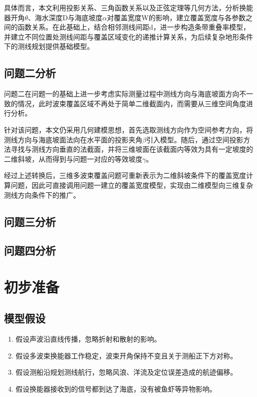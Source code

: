 \documentclass[UTF-8,a4paper,zihao=-4]{ctexart}
\begin{document}
具体而言，本文利用投影关系、三角函数关系以及正弦定理等几何方法，分析换能器开角$\theta$、海水深度D与海底坡度$\alpha$对覆盖宽度W的影响，建立覆盖宽度与各参数之间的函数关系。在此基础上，结合相邻测线间距d，进一步构造条带重叠率模型，并建立不同位置处测线间距与覆盖区域变化的递推计算关系，为后续复杂地形条件下的测线规划提供基础模型。

\subsection{问题二分析}
问题二在问题一的基础上进一步考虑实际测量过程中测线方向与海底坡面方向不一致的情况，此时波束覆盖区域不再处于简单二维截面内，而需要从三维空间角度进行分析。

针对该问题，本文仍采用几何建模思想，首先选取测线方向作为空间参考方向，将测线方向与海底坡面法向在水平面的投影夹角$\beta$引入模型。随后，通过空间投影方法寻找与测线方向垂直的法截面，并将三维坡面在该截面内等效为具有一定坡度的二维斜坡，从而得到与问题一对应的等效坡度$\gamma$。

经过上述转换后，三维多波束覆盖问题可重新表示为二维斜坡条件下的覆盖宽度计算问题，因此可直接调用问题一建立的覆盖宽度模型，实现由二维模型向三维复杂测线方向条件下的推广。

\subsection{问题三分析}

\subsection{问题四分析}
\section{初步准备}
\subsection{模型假设}
\begin{enumerate}
    \item 假设声波沿直线传播，忽略折射和散射的影响。
    \item 假设多波束换能器工作稳定，波束开角保持不变且关于测船正下方对称。
    \item 假设测船沿规划测线航行，忽略风浪、洋流及定位误差造成的航迹偏移。
    \item 假设换能器接收到的信号都到达了海底，没有被鱼虾等异物影响。
\end{enumerate}
\end{document}
